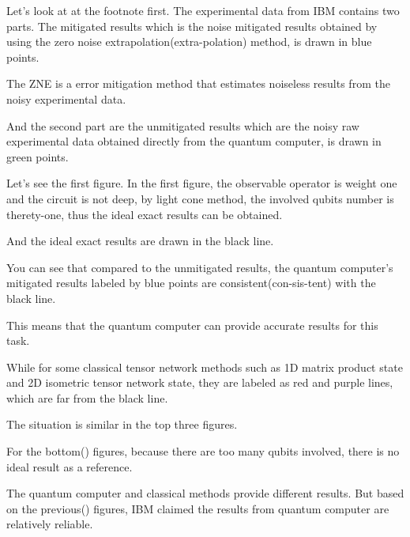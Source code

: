 \documentclass[10pt]{beamer}
\begin{document}
\begin{CJK}{UTF8}{gbsn}
{ Let's look at at the footnote first.
 The experimental data from IBM contains two parts.
  The mitigated results which is the noise mitigated results obtained by using the zero noise extrapolation(extra-polation) method, is drawn in blue points.
  
The ZNE is a error mitigation method that estimates noiseless results from the noisy experimental data.

And the second part are the unmitigated results which are the noisy raw experimental data obtained directly from the quantum computer, is drawn in green points.


Let's see the first figure. 
In the first figure, the observable operator is weight one and the circuit is not deep, by light cone method, the involved qubits number is therety-one, thus the ideal exact results can be obtained.

  
And the ideal exact results are drawn in the black line.
 
 
  You can see that compared to the unmitigated results, the quantum computer's mitigated results labeled by blue points are consistent(con-sis-tent) with the black line.

  This means that the quantum computer can provide accurate results for this task.
 
  While for some classical tensor network methods such as 1D matrix product state and 2D isometric tensor network state, they are labeled as red and purple lines, which are far from the black line.
 
  The situation is similar in the top three figures.




  For the bottom() figures, because there are too many qubits involved, there is no ideal result as a reference.
  
  The quantum computer and classical methods provide different results. But based on the previous() figures, IBM claimed the results from quantum computer are relatively reliable.
  
  
 
 
 }




\end{CJK}
\end{document}
